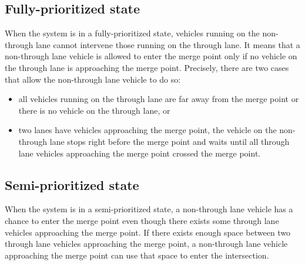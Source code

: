 \documentclass[10pt, conference, compsocconf]{IEEEtran}
\begin{document}
\subsection{Fully-prioritized state}
When the system is in a fully-prioritized state, vehicles running on the non-through lane cannot intervene those running on the through lane. 
It means that a non-through lane vehicle is allowed to enter the merge point only if no vehicle on the through lane is approaching the merge point.
Precisely, there are two cases that allow the non-through lane vehicle to do so:
\begin{itemize}
    \item all vehicles running on the through lane are far away from the merge point or there is no vehicle on the through lane, or
    \item two lanes have vehicles approaching the merge point, the vehicle on the non-through lane stops right before the merge point and waits until all through lane vehicles approaching the merge point crossed the merge point. 
\end{itemize}




\subsection{Semi-prioritized state}
\label{semi-case}
When the system is in a semi-prioritized state, a non-through lane vehicle has a chance to enter the merge point even though there exists some through lane vehicles approaching the merge point. 
If there exists enough space between two through lane vehicles approaching the merge point, a non-through lane vehicle approaching the merge point can use that space to enter the intersection.
\end{document}
